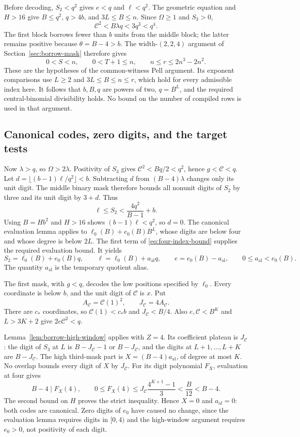 Before decoding, $S_2<q^2$ gives $e<q$ and $\ell<q^2$.
The geometric equation and $H>16$ give
$B\le q^2$, $q>4b$, and $3L\le B\le n$.
Since $\Omega\ge1$ and $S_3>0$,
\[
 \mathcal C^2<B\lambda q<3q^3<q^4.
\]
The first block borrows fewer than $b$ units from the middle block;
the latter remains positive because $\theta=B-4>b$.
The width-$(2,2,4)$ argument of Section~\ref{sec:borrow-mask} therefore
gives
\[
 0<S<n,\qquad 0<T+1\le n,\qquad n\le r\le2n^3-2n^2.
\]
These are the hypotheses of the common-witness Pell argument. Its
exponent comparisons use $L\ge2$ and $3L\le B\le n\le r$, which
hold for every admissible index here. It follows that $b,B,q$ are
powers of two, $q=B^L$, and the required central-binomial divisibility
holds. No bound on the number of compiled rows is used in that argument.

\subsection{Canonical codes, zero digits, and the target tests}

Now $\lambda>q$, so $\Omega>2\lambda$. Positivity of $S_3$ gives
$\mathcal C^2<Bq/2<q^2$, hence $g<\mathcal C<q$.
Let $d=\lfloor(b-1)\ell/q^2\rfloor<b$. Subtracting $d$ from
$(B-4)\lambda$ changes only its unit digit. The middle binary mask
therefore bounds all nonunit digits of $S_2$ by three and its unit
digit by $3+d$. Thus
\[
 \ell\le S_2<\frac{4q^2}{B-1}+b.
\]
Using $B=Hb^2$ and $H>16$ shows $(b-1)\ell<q^2$, so $d=0$.
The canonical evaluation lemma applies to
$\ell_0(B)+e_0(B)B^L$, whose digits are below four and whose degree
is below $2L$. The first term of \eqref{eq:four-index-bound} supplies
the required evaluation bound. It yields
\[
 S_2=\ell_0(B)+e_0(B)q,\qquad
 \ell=\ell_0(B)+a_{\mathrm{al}}q,\qquad e=e_0(B)-a_{\mathrm{al}},
 \qquad0\le a_{\mathrm{al}}<e_0(B).
\]
The quantity $a_{\mathrm{al}}$ is the temporary quotient alias.

The first mask, with $g<q$, decodes the low positions specified by
$\ell_0$. Every coordinate is below $b$, and the unit digit of
$\mathcal C$ is $x$. Put
\[
 A_{\mathcal C}=\mathcal C(1)^2,
 \qquad J_{\mathcal C}=4A_{\mathcal C}.
\]
There are $c_*$ coordinates, so
$\mathcal C(1)<c_*b$ and $J_{\mathcal C}<B/4$.
Also $e,\mathcal C<B^K$ and $L>3K+2$ give
$2e\mathcal C^2<q$.

Lemma~\ref{lem:borrow-high-window} applies with $Z=4$.
Its coefficient plateau is $J_{\mathcal C}$: the digit of $S_3$
at $L$ is $B-J_{\mathcal C}-1$ or $B-J_{\mathcal C}$, and the
digits at $L+1,\ldots,L+K$ are $B-J_{\mathcal C}$.
The high third-mask part is $X=(B-4)a_{\mathrm{al}}$, of degree at most $K$.
No overlap bounds every digit of $X$ by $J_{\mathcal C}$.
For its digit polynomial $F_X$, evaluation at four gives
\[
 B-4\mid F_X(4),\qquad
 0\le F_X(4)\le
 J_{\mathcal C}\frac{4^{K+1}-1}{3}<\frac B{12}<B-4.
\]
The second bound on $H$ proves the strict inequality. Hence $X=0$
and $a_{\mathrm{al}}=0$: both codes are canonical. Zero digits of $e_0$ have caused
no change, since the evaluation lemma requires digits in $[0,4)$ and
the high-window argument requires $e_0>0$, not positivity of each digit.

